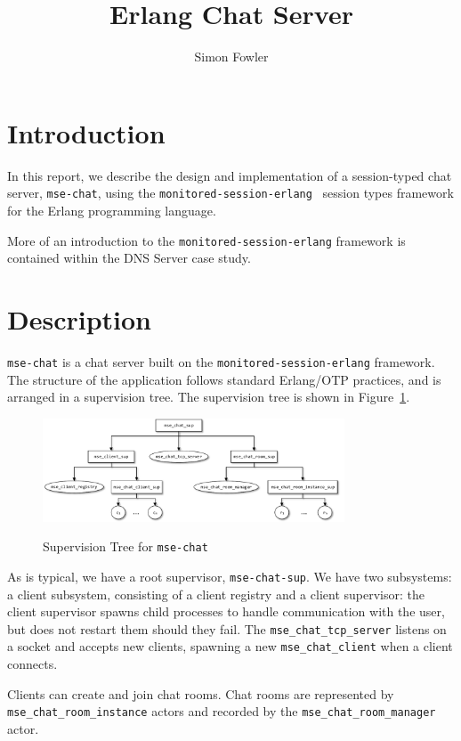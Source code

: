 \documentclass[a4paper]{article}
\title{Erlang Chat Server}
\author{Simon Fowler}
\newcommand{\mse}[0]{\texttt{monitored-session-erlang}}
\newcommand{\msechat}[0]{\texttt{mse-chat}}
\begin{document}
\maketitle

\section{Introduction}
In this report, we describe the design and implementation of a session-typed chat server, \msechat{}, using the \mse{}~\cite{fowler:msc} session types framework for the Erlang programming language.

More of an introduction to the \mse{} framework is contained within the DNS Server case study.

\section{Description}
\msechat{} is a chat server built on the \mse{} framework. The structure of the application follows standard Erlang/OTP practices, and is arranged in a supervision tree. The supervision tree is shown in Figure~\ref{edns-supervision-tree}.

\begin{figure}[htpb]
\centering
\includegraphics[width=0.8\textwidth]{MSE-Chat-Tree.pdf}
\label{edns-supervision-tree}
\caption{Supervision Tree for \texttt{mse-chat}}
\end{figure}

As is typical, we have a root supervisor, \texttt{mse-chat-sup}. We have two subsystems: a client subsystem, consisting of a client registry and a client supervisor: the client supervisor spawns child processes to handle communication with the user, but does not restart them should they fail. The \texttt{mse\_chat\_tcp\_server} listens on a socket and accepts new clients, spawning a new \texttt{mse\_chat\_client} when a client connects.

Clients can create and join chat rooms. Chat rooms are represented by \texttt{mse\_chat\_room\_instance} actors and recorded by the \texttt{mse\_chat\_room\_manager} actor. 
\end{document}
